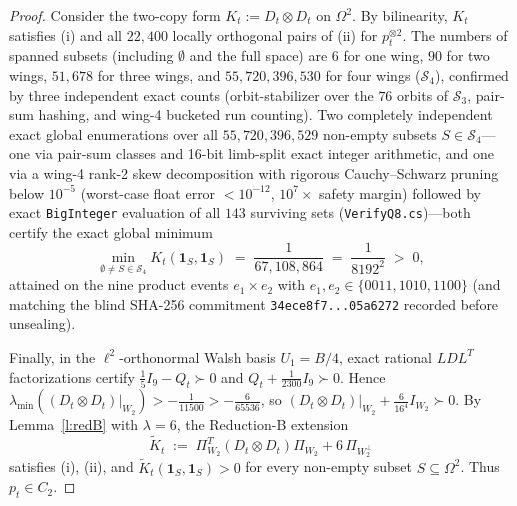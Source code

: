 \documentclass[11pt,a4paper]{article}
\theoremstyle{definition}
\theoremstyle{remark}
\newcommand{\ind}[1]{\mathbf{1}_{#1}}
\begin{document}
\begin{proof}
Consider the two-copy form $K_t := D_t \otimes D_t$ on $\Omega^2$. By bilinearity, $K_t$ satisfies (i) and all $22{,}400$ locally orthogonal pairs of (ii) for $p_t^{\otimes 2}$. The numbers of spanned subsets (including $\emptyset$ and the full space) are $6$ for one wing, $90$ for two wings, $51{,}678$ for three wings, and $55{,}720{,}396{,}530$ for four wings ($\mathcal{S}_4$), confirmed by three independent exact counts (orbit-stabilizer over the $76$ orbits of $\mathcal{S}_3$, pair-sum hashing, and wing-4 bucketed run counting). Two completely independent exact global enumerations over all $55{,}720{,}396{,}529$ non-empty subsets $S \in \mathcal{S}_4$---one via pair-sum classes and 16-bit limb-split exact integer arithmetic, and one via a wing-4 rank-2 skew decomposition with rigorous Cauchy--Schwarz pruning below $10^{-5}$ (worst-case float error $< 10^{-12}$, $10^7\times$ safety margin) followed by exact \texttt{BigInteger} evaluation of all $143$ surviving sets (\texttt{VerifyQ8.cs})---both certify the exact global minimum
\[
  \min_{\emptyset \neq S \in \mathcal{S}_4} K_t(\ind S, \ind S) \;=\; \frac{1}{67{,}108{,}864} \;=\; \frac{1}{8192^2} \;>\; 0,
\]
attained on the nine product events $e_1 \times e_2$ with $e_1, e_2 \in \{0011, 1010, 1100\}$ (and matching the blind SHA-256 commitment \texttt{34ece8f7...05a6272} recorded before unsealing).

Finally, in the $\ell^2$-orthonormal Walsh basis $U_1 = B/4$, exact rational $LDL^T$ factorizations certify $\frac{1}{5} I_9 - Q_t \succ 0$ and $Q_t + \frac{1}{2300} I_9 \succ 0$. Hence $\lambda_{\min}((D_t \otimes D_t)|_{W_2}) > -\frac{1}{11500} > -\frac{6}{65536}$, so $(D_t \otimes D_t)|_{W_2} + \frac{6}{16^4} I_{W_2} \succ 0$. By Lemma~\ref{l:redB} with $\lambda = 6$, the Reduction-B extension
\[
  \widetilde{K}_t \;:=\; \Pi_{W_2}^T (D_t \otimes D_t) \Pi_{W_2} + 6\,\Pi_{W_2^\perp}
\]
satisfies (i), (ii), and $\widetilde{K}_t(\ind S, \ind S) > 0$ for every non-empty subset $S \subseteq \Omega^2$. Thus $p_t \in C_2$.
\end{proof}
\end{document}
